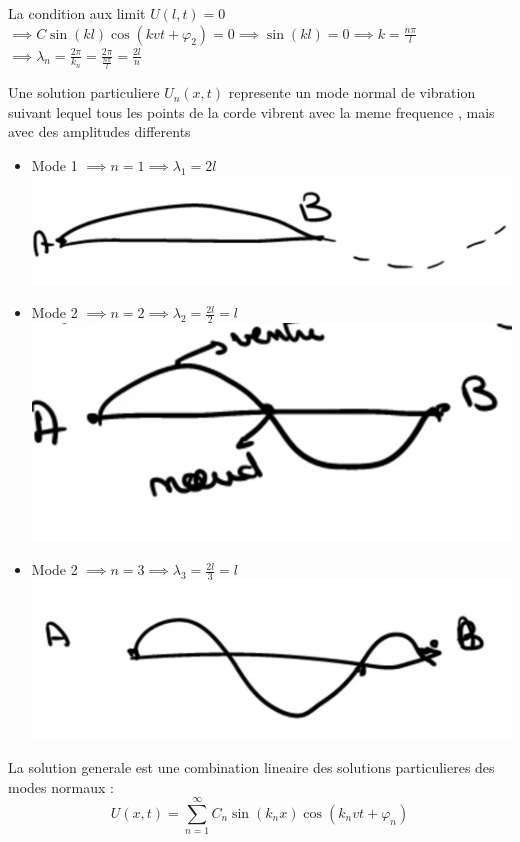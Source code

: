 \documentclass[12pt]{book}
\begin{document}
            La condition aux limit $ U(l,t) =0$ \\
            $\implies C\sin(kl)\cos(kvt+\varphi_2)=0 \implies \sin(kl)=0\implies k=\frac{n\pi}{l}$\\
            $ \implies \lambda_n = \frac{2\pi}{k_n}=\frac{2\pi}{\frac{n\pi}{l}}=\frac{2l}{n} $\\
            \begin{center}
            \end{center}
            Une solution particuliere $U_n(x,t)$ represente un mode normal de vibration suivant lequel tous les points de la corde vibrent avec la meme frequence , mais avec des amplitudes differents\\
            \begin{itemize}
                \item Mode 1 $ \implies n=1 \implies \lambda_1 = 2l $ \\ \includegraphics[width=0.5\linewidth]{pic/cordemod1.png}
                \item Mode 2 $ \implies n=2 \implies \lambda_2 = \frac{2l}{2}=l $\\ \includegraphics[width=0.5\linewidth]{pic/cordemod2.png}
                \item Mode 2 $ \implies n=3 \implies \lambda_3 = \frac{2l}{3}=l $\\ \includegraphics[width=0.5\linewidth]{pic/cordemod3.png}
            \end{itemize}
            La solution generale est une combination lineaire des solutions particulieres des modes normaux : \\
            \[ U(x,t) = \sum^\infty_{n=1}C_n\sin(k_nx)\cos(k_nvt+\varphi_n) \]
\end{document}
